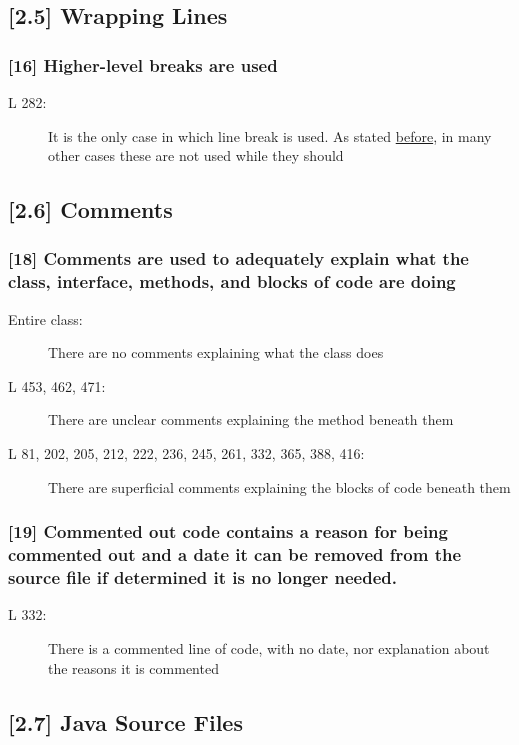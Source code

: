\subsection*{[2.5] Wrapping Lines}
\subsubsection*{[16] Higher-level breaks are used}
\begin{description}
	\item[L 282:] It is the only case in which line break is used. As stated \hyperref[subsec:lineLen]{before}, in many other cases these are not used while they should
\end{description}

\subsection*{[2.6] Comments}
\subsubsection*{[18] Comments are used to adequately explain what the class, interface, methods, and blocks of code are doing}
\begin{description}
	\item[Entire class:] There are no comments explaining what the class does
	\item[L 453, 462, 471:] There are unclear comments explaining the method beneath them
	\item[L 81, 202, 205, 212, 222, 236, 245, 261, 332, 365, 388, 416:] There are superficial comments explaining the blocks of code beneath them 
\end{description}

\subsubsection*{[19] Commented out code contains a reason for being commented out and a date it can be removed from the source file if determined it is no longer needed.}
\begin{description}
	\item[L 332:] There is a commented line of code, with no date, nor explanation about the reasons it is commented
\end{description}

\subsection*{[2.7] Java Source Files}

